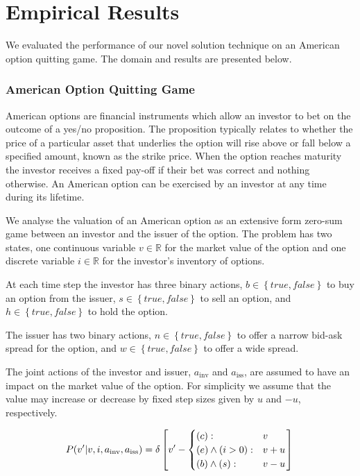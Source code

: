 \section{Empirical Results}
\label{sec:results}

We evaluated the performance of our novel solution technique on an 
American option quitting game. The domain and results are presented
below.

\subsubsection{American Option Quitting Game}

American options are financial instruments which allow an investor to
bet on the outcome of a yes/no proposition. The proposition typically
relates to whether the price of a particular asset that underlies the option
will rise above or fall below a specified amount, known as the strike
price. When the option reaches maturity the investor receives a fixed
pay-off if their bet was correct and nothing otherwise. An American 
option can be exercised by an investor at any time during its lifetime.

We analyse the valuation of an American option as an extensive form
zero-sum game between an investor and the issuer of the option.
The problem has two states, one continuous variable $v \in \mathbb{R}$ for the 
market value of the option and one discrete variable $i \in \mathbb{R}$ for the 
investor's inventory of options. 

At each time step the investor has three binary actions, 
$b \in \left\{true, false\right\}$ to buy an option from the issuer, 
$s \in \left\{true, false\right\}$ to sell an option, and 
$h \in \left\{true, false\right\}$ to hold the option. 

The issuer has two binary actions, 
 $n \in \left\{true, false\right\}$ to offer a narrow bid-ask spread for the
option, and $w \in \left\{true, false\right\}$ to offer a wide spread.

The joint actions of the investor and issuer, $a_{\text{inv}}$ and 
$a_{\text{iss}}$, are assumed to have an impact on the market value
of the option. For simplicity we assume that the value may increase or
decrease by fixed step sizes given by $u$ and $-u$, respectively.

\begin{equation*}
P(v' | v, i, a_{\text{inv}}, a_{\text{iss}}) = \delta \left[ v' - \begin{cases}
      (c)  : & v \\ 
      (e) \wedge (i > 0): & v + u \\ 
      (b) \wedge (s) : & v - u \\ 
    \end{cases} \right] \\    
\end{equation*}

